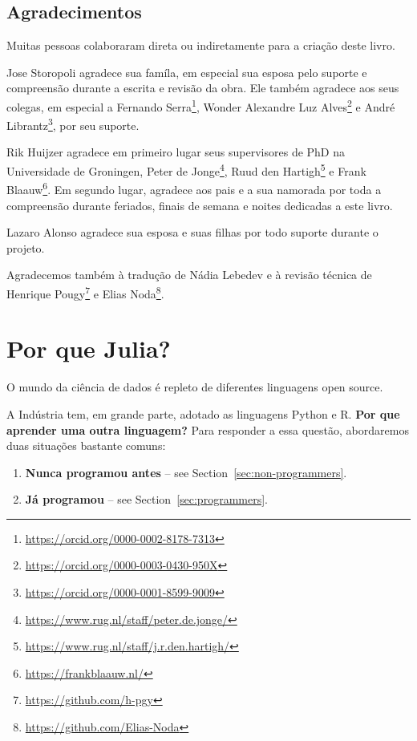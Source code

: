 \documentclass[
  notoc %
]{tufte-book}
\DeclareRobustCommand{\href}[2]{#2\footnote{\url{#1}}}
\begin{document}
\hypertarget{agradecimentos}{%
\section{Agradecimentos}\label{agradecimentos}}

Muitas pessoas colaboraram direta ou indiretamente para a criação deste
livro.

Jose Storopoli agradece sua famíla, em especial sua esposa pelo suporte
e compreensão durante a escrita e revisão da obra. Ele também agradece
aos seus colegas, em especial a
\href{https://orcid.org/0000-0002-8178-7313}{Fernando Serra},
\href{https://orcid.org/0000-0003-0430-950X}{Wonder Alexandre Luz Alves}
e \href{https://orcid.org/0000-0001-8599-9009}{André Librantz}, por seu
suporte.

Rik Huijzer agradece em primeiro lugar seus supervisores de PhD na
Universidade de Groningen,
\href{https://www.rug.nl/staff/peter.de.jonge/}{Peter de Jonge},
\href{https://www.rug.nl/staff/j.r.den.hartigh/}{Ruud den Hartigh} e
\href{https://frankblaauw.nl/}{Frank Blaauw}. Em segundo lugar, agradece
aos pais e a sua namorada por toda a compreensão durante feriados,
finais de semana e noites dedicadas a este livro.

Lazaro Alonso agradece sua esposa e suas filhas por todo suporte durante
o projeto.

Agradecemos também à tradução de Nádia Lebedev e à revisão técnica de
\href{https://github.com/h-pgy}{Henrique Pougy} e
\href{https://github.com/Elias-Noda}{Elias Noda}.

\hypertarget{sec:why_julia}{%
\chapter{Por que Julia?}\label{sec:why_julia}}

O mundo da ciência de dados é repleto de diferentes linguagens open
source.

A Indústria tem, em grande parte, adotado as linguagens Python e R.
\textbf{Por que aprender uma outra linguagem?} Para responder a essa
questão, abordaremos duas situações bastante comuns:

\begin{enumerate}
\def\labelenumi{\arabic{enumi}.}
\item
  \textbf{Nunca programou antes} -- see
  Section~\ref{sec:non-programmers}.
\item
  \textbf{Já programou} -- see Section~\ref{sec:programmers}.
\end{enumerate}
\end{document}
